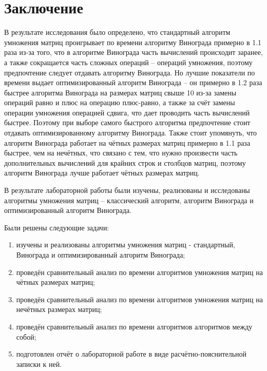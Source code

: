 \chapter*{Заключение}

В результате исследования было определено, что стандартный алгоритм умножения матриц проигрывает по времени алгоритму Винограда примерно в 1.1 раза из-за того, что в алгоритме Винограда часть вычислений происходит заранее, а также сокращается часть сложных операций -- операций умножения, поэтому предпочтение следует отдавать алгоритму Винограда. 
Но лучшие показатели по времени выдает оптимизированный алгоритм Винограда -- он примерно в 1.2 раза быстрее алгоритма Винограда на размерах матриц свыше 10 из-за замены операций равно и плюс на операцию плюс-равно, а также за счёт замены операции умножения операцией сдвига, что дает проводить часть вычислений быстрее. 
Поэтому при выборе самого быстрого алгоритма предпочтение стоит отдавать оптимизированному алгоритму Винограда. 
Также стоит упомянуть, что алгоритм Винограда работает на чётных размерах матриц примерно в 1.1 раза быстрее, чем на нечётных, что связано с тем, что нужно произвести часть дополнительных вычислений для крайних строк и столбцов матриц, поэтому алгоритм Винограда лучше работает чётных размерах матриц.


В результате лабораторной работы были изучены, реализованы и исследованы алгоритмы умножения матриц -- классический алгоритм, алгоритм Винограда и оптимизированный алгоритм Винограда.

Были решены следующие задачи:

\begin{enumerate}[label=\arabic*)]
	\item изучены и реализованы алгоритмы умножения матриц - стандартный, Винограда и оптимизированный алгоритм Винограда;
    \item проведён сравнительный анализ по времени алгоритмов умножения матриц на чётных размерах матриц;
	\item проведён сравнительный анализ по времени алгоритмов умножения матриц на нечётных размерах матриц;
	\item проведён сравнительный анализ по времени алгоритмов алгоритмов между собой;
	\item подготовлен отчёт о лабораторной работе в виде расчётно-пояснительной записки к ней.
\end{enumerate}